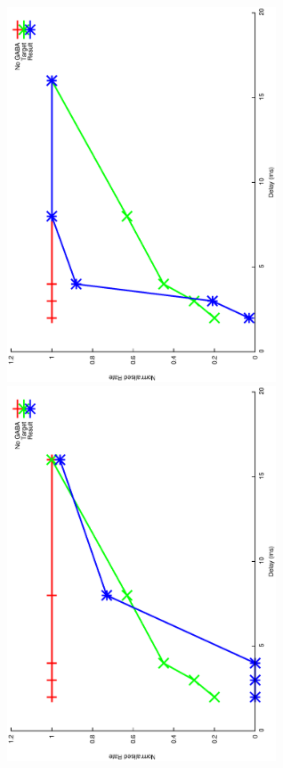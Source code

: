 \documentclass{article}
\begin{document}
\includegraphics[keepaspectratio=true,angle=-90,width=0.6\textwidth]{DS_ClickRecovery_result.6.eps}\clearpage
\includegraphics[keepaspectratio=true,angle=-90,width=0.6\textwidth]{DS_ClickRecovery_result.7.eps}\clearpage
\end{document}
